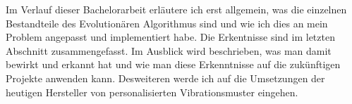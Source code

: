 
Im Verlauf dieser Bachelorarbeit erl{\"a}utere ich erst allgemein, was die einzelnen Bestandteile des Evolution{\"a}ren Algorithmus sind und wie ich dies an mein Problem angepasst und implementiert habe. Die Erkentnisse sind im letzten Abschnitt zusammengefasst. 
Im Ausblick wird beschrieben, was man damit bewirkt und erkannt hat und wie man diese Erkenntnisse auf die zuk{\"u}nftigen Projekte anwenden kann. 
Desweiteren werde ich auf die Umsetzungen der heutigen Hersteller von personalisierten Vibrationsmuster eingehen.

